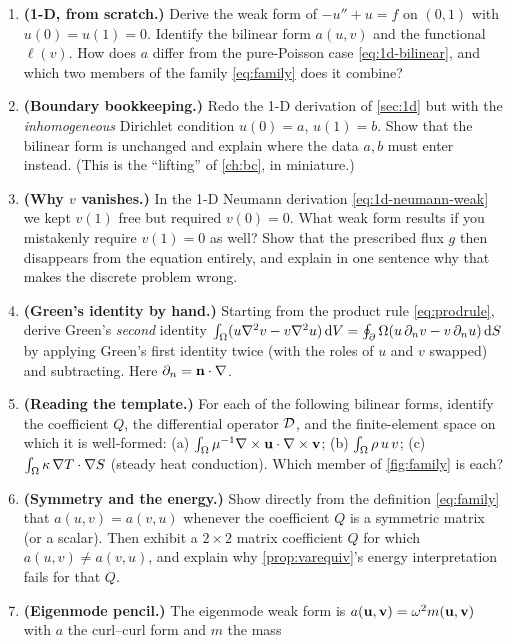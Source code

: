\exercisessection
\begin{enumerate}[nosep]
  \item \textbf{(1-D, from scratch.)} Derive the weak form of $-u''+u=f$ on
  $(0,1)$ with $u(0)=u(1)=0$. Identify the bilinear form $a(u,v)$ and the
  functional $\ell(v)$. How does $a$ differ from the pure-Poisson case
  \cref{eq:1d-bilinear}, and which two members of the family
  \cref{eq:family} does it combine?
  \item \textbf{(Boundary bookkeeping.)} Redo the 1-D derivation of
  \cref{sec:1d} but with the \emph{inhomogeneous} Dirichlet condition $u(0)=a$,
  $u(1)=b$. Show that the bilinear form is unchanged and explain where the data
  $a,b$ must enter instead. (This is the ``lifting'' of \cref{ch:bc}, in
  miniature.)
  \item \textbf{(Why $v$ vanishes.)} In the 1-D Neumann derivation
  \cref{eq:1d-neumann-weak} we kept $v(1)$ free but required $v(0)=0$. What weak
  form results if you mistakenly require $v(1)=0$ as well? Show that the
  prescribed flux $g$ then disappears from the equation entirely, and explain in
  one sentence why that makes the discrete problem wrong.
  \item \textbf{(Green's identity by hand.)} Starting from the product rule
  \cref{eq:prodrule}, derive Green's \emph{second} identity
  $\int_\Omega (u\nabla^2 v - v\nabla^2 u)\,\mathrm{d}V = \oint_\partial\Omega(u\,\partial_n v - v\,\partial_n
  u)\,\mathrm{d}S$ by applying Green's first identity twice (with the roles of
  $u$ and $v$ swapped) and subtracting. Here $\partial_n=\mathbf{n}\cdot\nabla$.
  \item \textbf{(Reading the template.)} For each of the following bilinear
  forms, identify the coefficient $Q$, the differential operator $\mathcal{D}$, and
  the finite-element space on which it is well-formed: (a)
  $\int_\Omega \mu^{-1}\nabla\times\mathbf{u}\cdot\nabla\times\mathbf{v}$; (b) $\int_\Omega \rho\,u\,v$; (c)
  $\int_\Omega \kappa\,\nabla T\cdot\nabla S$ (steady heat conduction). Which member
  of \cref{fig:family} is each?
  \item \textbf{(Symmetry and the energy.)} Show directly from the definition
  \cref{eq:family} that $a(u,v)=a(v,u)$ whenever the coefficient $Q$ is a
  symmetric matrix (or a scalar). Then exhibit a $2\times2$ matrix coefficient
  $Q$ for which $a(u,v)\neq a(v,u)$, and explain why \cref{prop:varequiv}'s
  energy interpretation fails for that $Q$.
  \item \textbf{(Eigenmode pencil.)} The eigenmode weak form is
  $a(\mathbf{u},\mathbf{v})=\omega^2 m(\mathbf{u},\mathbf{v})$ with $a$ the curl--curl form and $m$ the mass

\end{enumerate}
